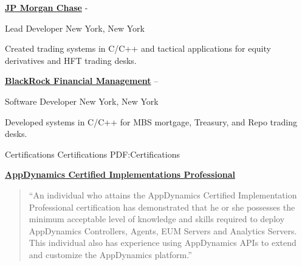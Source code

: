 \documentclass[letterpaper,MMMMyyyy,nonstopmode]{simpleresumecv}
\begin{document}
\begin{Body}
\BigGap
\Entry
\href{http://www.jpmorganchase.com/}
{\textbf{JP Morgan Chase}}
\hfill 
 - 

Lead Developer
\hfill
New York, New York

\begin{Detail}
\Item
Created trading systems in C/C++ and tactical applications for equity derivatives and HFT trading desks.

\end{Detail}

\BigGap
\Entry
\href{http://www.blackrock.com/}
{\textbf{BlackRock Financial Management}}
\hfill 
 --  

Software Developer
\hfill
New York, New York

\begin{Detail}
\Item
Developed systems in C/C++ for MBS mortgage, Treasury, and Repo trading desks.
\end{Detail}

\iffalse
\BigGap
\Entry
\textbf{Prophet 21, Inc.}
\hfill 
Yardley, Pennsylvania

Associate Developer
\hfill
\DatestampYM{1992}{06} --  \DatestampYM{1993}{03}

\begin{Detail}
\BulletItem
Wrote and maintained features for point-of-sale systems targeted to retailers and wholesalers

\Gap
Technologies: Sybase, ksh
\end{Detail}
\fi



\Section
{Certifications}
{Certifications}
{PDF:Certifications}

\Entry
\href{https://www.appdynamics.com/certifications/}
{\textbf{AppDynamics Certified Implementations Professional}}
\hfill
{}
\begin{Detail}
\begin{quote}
``An individual who attains the AppDynamics Certified Implementation Professional certification has demonstrated that he or she possesses the minimum acceptable level of knowledge and skills required to deploy AppDynamics Controllers, Agents, EUM Servers and Analytics Servers. 
This individual also has experience using AppDynamics APIs to extend and customize the AppDynamics platform.''
\end{quote}
\end{Detail}


\end{Body}
\end{document}
